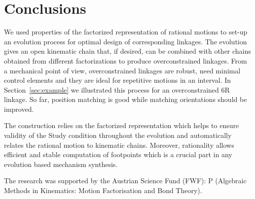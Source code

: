 \documentclass{scrartcl}
\begin{document}
\section{Conclusions}
\label{sec:conclusions}

We used properties of the factorized representation of rational motions to
set-up an evolution process for optimal design of corresponding linkages. The
evolution gives an open kinematic chain that, if desired, can be combined with
other chains obtained from different factorizations to produce overconstrained
linkages. From a mechanical point of view, overconstrained linkages are robust,
need minimal control elements and they are ideal for repetitive motions in an
interval. In Section~\ref{sec:example} we illustrated this process for an
overconstrained 6R linkage. So far, position matching is good while matching
orientations should be improved.

The construction relies on the factorized representation which helps to ensure
validity of the Study condition throughout the evolution and automatically
relates the rational motion to kinematic chains. Moreover, rationality allows
efficient and stable computation of footpoints which is a crucial part in any
evolution based mechanism synthesis.













  The research was supported by the Austrian Science Fund (FWF): P
  (Algebraic Methods in Kinematics: Motion Factorisation and Bond Theory).
\end{document}
